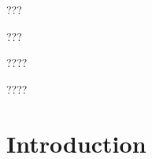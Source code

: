 \documentclass[review,12pt,authoryear]{elsarticle}
\begin{document}
\begin{linenumbers}
\begin{frontmatter}
\begin{highlights}
 \item ???
 \item ???
 \item ????
 \item ????
\end{highlights}
\end{frontmatter}


\section{Introduction}

% 
% 
%
%
%  



\end{linenumbers}
\end{document}
